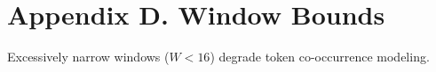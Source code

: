 \section*{Appendix D. Window Bounds}Excessively narrow windows ($W < 16$) degrade token co-occurrence modeling.
